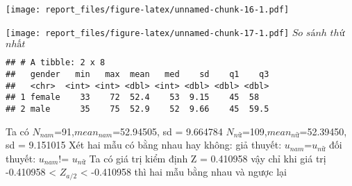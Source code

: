 \documentclass[
]{article}
\newenvironment{Shaded}{\begin{snugshade}}{\end{snugshade}}
\newcommand{\DataTypeTok}[1]{\textcolor[rgb]{0.13,0.29,0.53}{#1}}
\newcommand{\FloatTok}[1]{\textcolor[rgb]{0.00,0.00,0.81}{#1}}
\newcommand{\KeywordTok}[1]{\textcolor[rgb]{0.13,0.29,0.53}{\textbf{#1}}}
\newcommand{\NormalTok}[1]{#1}
\newcommand{\OperatorTok}[1]{\textcolor[rgb]{0.81,0.36,0.00}{\textbf{#1}}}
\newcommand{\OtherTok}[1]{\textcolor[rgb]{0.56,0.35,0.01}{#1}}
\newcommand{\StringTok}[1]{\textcolor[rgb]{0.31,0.60,0.02}{#1}}
\begin{document}
\texttt{[image: report\_files/figure-latex/unnamed-chunk-16-1.pdf]}

\begin{Shaded}
\end{Shaded}

\texttt{[image: report\_files/figure-latex/unnamed-chunk-17-1.pdf]}
\(So\) \(sánh\) \(thứ\) \(nhất\)

\begin{Shaded}
\end{Shaded}

\begin{verbatim}
## # A tibble: 2 x 8
##   gender   min   max  mean   med    sd    q1    q3
##   <chr>  <int> <int> <dbl> <int> <dbl> <dbl> <dbl>
## 1 female    33    72  52.4    53  9.15    45  58  
## 2 male      35    75  52.9    52  9.66    45  59.5
\end{verbatim}

Ta có \(N_{nam}\)=91,\(mean_{nam}\)=52.94505, sd = 9.664784
\(N_{nữ}\)=109,\(mean_{nữ}\)=52.39450, sd = 9.151015 Xét hai mẫu có bằng
nhau hay không: giả thuyết: \(u_{nam}\)=\(u_{nữ}\) đối thuyết:
\(u_{nam}\)!= \(u_{nữ}\) Ta có giá trị kiểm định Z = 0.410958 vậy chỉ
khi giá trị -0.410958 \textless{} \(Z_{a/2}\) \textless{} -0.410958 thì
hai mẫu bằng nhau và ngược lại
\end{document}
